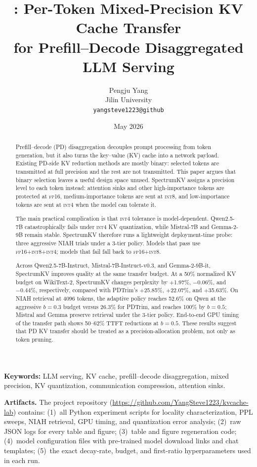 \documentclass[11pt]{article}
\title{\vspace{-0.6em}\method{}: Per-Token Mixed-Precision KV Cache Transfer\\for Prefill--Decode Disaggregated LLM Serving\vspace{-0.25em}}
\author{Pengju Yang\\Jilin University\\\texttt{yangsteve1223@github}}
\date{May 2026}
\newcommand{\method}{SpectrumKV}
\newcommand{\niah}{NIAH}
\newcommand{\budget}{b}
\newcommand{\pct}{\%}
\newcommand{\fp}{\textsc{fp16}}
\newcommand{\intviii}{\textsc{int8}}
\newcommand{\intiv}{\textsc{int4}}
\theoremstyle{plain}
\theoremstyle{definition}
\begin{document}
\maketitle

\begin{abstract}
Prefill--decode (PD) disaggregation decouples prompt processing from token generation, but it also turns the key--value (KV) cache into a network payload.  Existing PD-side KV reduction methods are mostly binary: selected tokens are transmitted at full precision and the rest are not transmitted.  This paper argues that binary selection leaves a useful design space unused.  \method{} assigns a precision level to each token instead: attention sinks and other high-importance tokens are protected at \fp{}, medium-importance tokens are sent at \intviii{}, and low-importance tokens are sent at \intiv{} when the model can tolerate it.

The main practical complication is that \intiv{} tolerance is model-dependent.  Qwen2.5-7B catastrophically fails under \intiv{} KV quantization, while Mistral-7B and Gemma-2-9B remain stable.  \method{} therefore runs a lightweight deployment-time probe: three aggressive \niah{} trials under a 3-tier policy.  Models that pass use \fp{}+\intviii{}+\intiv{}; models that fail fall back to \fp{}+\intviii{}.

Across Qwen2.5-7B-Instruct, Mistral-7B-Instruct-v0.3, and Gemma-2-9B-it, \method{} improves quality at the same transfer budget.  At a 50\pct{} normalized KV budget on WikiText-2, \method{} changes perplexity by +1.97\pct{}, $-0.06$\pct{}, and $-0.44$\pct{}, respectively, compared with PDTrim's +25.85\pct{}, +22.07\pct{}, and +35.63\pct{}.  On \niah{} retrieval at 4096 tokens, the adaptive policy reaches 52.6\pct{} on Qwen at the aggressive $\budget=0.3$ budget versus 26.3\pct{} for PDTrim, and reaches 100\pct{} by $\budget=0.5$; Mistral and Gemma preserve retrieval under the 3-tier policy.  End-to-end GPU timing of the transfer path shows 50--62\pct{} TTFT reductions at $\budget=0.5$.  These results suggest that PD KV transfer should be treated as a precision-allocation problem, not only as token pruning.
\end{abstract}

\vspace{0.3em}
\noindent\textbf{Keywords:} LLM serving, KV cache, prefill--decode disaggregation, mixed precision, KV quantization, communication compression, attention sinks.

\noindent\textbf{Artifacts.} The project repository (\url{https://github.com/YangSteve1223/kvcache-lab}) contains: (1)~all Python experiment scripts for locality characterization, PPL sweeps, NIAH retrieval, GPU timing, and quantization error analysis; (2)~raw JSON logs for every table and figure; (3)~table and figure regeneration code; (4)~model configuration files with pre-trained model download links and chat templates; (5)~the exact decay-rate, budget, and first-ratio hyperparameters used in each run.
\end{document}
